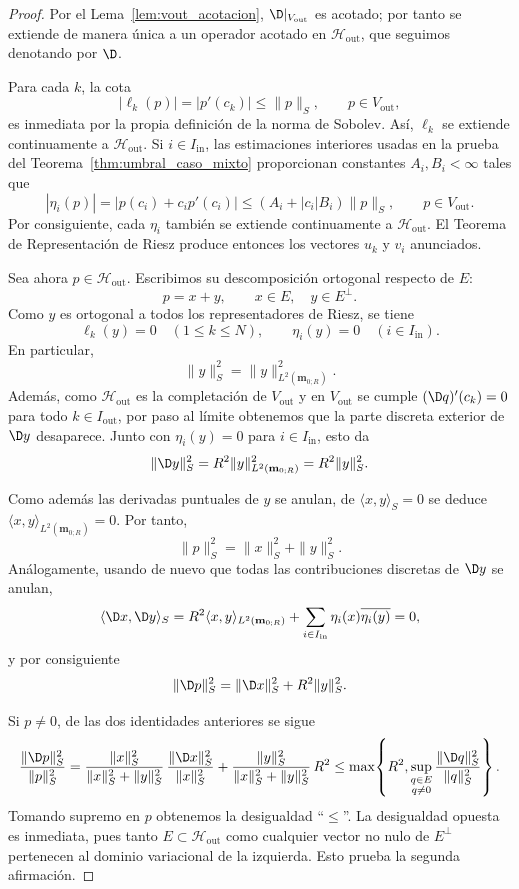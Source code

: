 \begin{proof}
	Por el Lema~\ref{lem:vout_acotacion}, $\D|_{V_{\mathrm{out}}}$ es acotado; por tanto se extiende de manera única a un operador acotado en $\mathcal H_{\mathrm{out}}$, que seguimos denotando por $\D$.

	Para cada $k$, la cota
	\[
		|\ell_k(p)|=|p'(c_k)|\le \|p\|_S,
		\qquad p\in V_{\mathrm{out}},
	\]
	es inmediata por la propia definición de la norma de Sobolev. Así, $\ell_k$ se extiende continuamente a $\mathcal H_{\mathrm{out}}$.
	Si $i\in I_{\mathrm{in}}$, las estimaciones interiores usadas en la prueba del Teorema~\ref{thm:umbral_caso_mixto} proporcionan constantes $A_i,B_i<\infty$ tales que
	\[
		|\eta_i(p)|=|p(c_i)+c_ip'(c_i)|\le (A_i+|c_i|B_i)\|p\|_S,
		\qquad p\in V_{\mathrm{out}}.
	\]
	Por consiguiente, cada $\eta_i$ también se extiende continuamente a $\mathcal H_{\mathrm{out}}$. El Teorema de Representación de Riesz produce entonces los vectores $u_k$ y $v_i$ anunciados.

	Sea ahora $p\in \mathcal H_{\mathrm{out}}$. Escribimos su descomposición ortogonal respecto de $E$:
	\[
		p=x+y,
		\qquad x\in E,
		\quad y\in E^{\perp}.
	\]
	Como $y$ es ortogonal a todos los representadores de Riesz, se tiene
	\[
		\ell_k(y)=0\quad (1\le k\le N),
		\qquad
		\eta_i(y)=0\quad (i\in I_{\mathrm{in}}).
	\]
	En particular,
	\[
		\|y\|_S^2=\|y\|_{L^2(\mathbf m_{0;R})}^2.
	\]
	Además, como $\mathcal H_{\mathrm{out}}$ es la completación de $V_{\mathrm{out}}$ y en $V_{\mathrm{out}}$ se cumple $(\D q)'(c_k)=0$ para todo $k\in I_{\mathrm{out}}$, por paso al límite obtenemos que la parte discreta exterior de $\D y$ desaparece. Junto con $\eta_i(y)=0$ para $i\in I_{\mathrm{in}}$, esto da
	\[
		\|\D y\|_S^2=R^2\|y\|_{L^2(\mathbf m_{0;R})}^2=R^2\|y\|_S^2.
	\]

	Como además las derivadas puntuales de $y$ se anulan, de $\langle x,y\rangle_S=0$ se deduce $\langle x,y\rangle_{L^2(\mathbf m_{0;R})}=0$. Por tanto,
	\[
		\|p\|_S^2=\|x\|_S^2+\|y\|_S^2.
	\]
	Análogamente, usando de nuevo que todas las contribuciones discretas de $\D y$ se anulan,
	\[
		\langle \D x,\D y\rangle_S
		=
		R^2\langle x,y\rangle_{L^2(\mathbf m_{0;R})}
		+
		\sum_{i\in I_{\mathrm{in}}}\eta_i(x)\overline{\eta_i(y)}
		=0,
	\]
	y por consiguiente
	\[
		\|\D p\|_S^2=\|\D x\|_S^2+R^2\|y\|_S^2.
	\]

	Si $p\neq0$, de las dos identidades anteriores se sigue
	\[
		\frac{\|\D p\|_S^2}{\|p\|_S^2}
		=
		\frac{\|x\|_S^2}{\|x\|_S^2+\|y\|_S^2}\,
		\frac{\|\D x\|_S^2}{\|x\|_S^2}
		+
		\frac{\|y\|_S^2}{\|x\|_S^2+\|y\|_S^2}\,R^2
		\le
		\max\!\left\{R^2,\sup_{\substack{q\in E\\q\neq0}}\frac{\|\D q\|_S^2}{\|q\|_S^2}\right\}.
	\]
	Tomando supremo en $p$ obtenemos la desigualdad “$\le$”. La desigualdad opuesta es inmediata, pues tanto $E\subset \mathcal H_{\mathrm{out}}$ como cualquier vector no nulo de $E^{\perp}$ pertenecen al dominio variacional de la izquierda. Esto prueba la segunda afirmación.


\end{proof}
